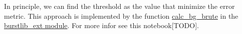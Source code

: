 In principle, we can find the threshold as the value that minimize the error metric. This approach is implemented by the function \href{http://fretbursts.readthedocs.org/en/latest/plugins.html#fretbursts.burstlib_ext.calc_bg_brute}{calc\_bg\_brute} in the \href{http://fretbursts.readthedocs.org/en/latest/plugins.html}{burstlib\_ext module}. For more infor see this notebook[TODO].
